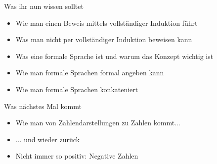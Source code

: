 \begin{frame}	
	\begin{block}{Was ihr nun wissen solltet}
		\begin{itemize}
			\item Wie man einen Beweis mittels vollständiger Induktion führt
			\item Was man nicht per vollständiger Induktion beweisen kann
			\item Was eine formale Sprache ist und warum das Konzept wichtig ist
			\item Wie man formale Sprachen formal angeben kann
			\item Wie man formale Sprachen konkateniert
		\end{itemize}
	\end{block}
	
	\begin{block}{Was nächstes Mal kommt}
		\begin{itemize}
			\item Wie man von Zahlendarstellungen zu Zahlen kommt...
			\item[] ... und wieder zurück
			\item Nicht immer so positiv: Negative Zahlen
		\end{itemize}
	\end{block}
\end{frame}

\slideThanks


